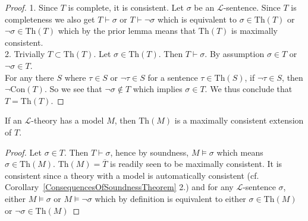 \begin{proof}
    1. Since $T$ is complete, it is consistent. Let $\sigma$ be an $\mathcal{L}$-sentence. Since $T$ is completeness we also get $T\vdash \sigma$ or $T\vdash \neg\sigma$ which is equivalent to $\sigma\in \mathrm{Th}(T)$ or $\neg \sigma\in \mathrm{Th}(T)$ which by the prior lemma means that $\mathrm{Th}(T)$ is maximally consistent.\\
    2. Trivially $T\subset \mathrm{Th}(T)$. Let $\sigma \in \mathrm{Th}(T)$. Then $T\vdash \sigma$. By assumption $\sigma\in T$ or $\neg\sigma\in T$.\\ 
    For any there $S$ where $\tau\in S$ or $\neg\tau\in S$ for a  sentence $\tau\in \mathrm{Th}(S)$, if $\neg\tau\in S$, then $\neg\mathrm{Con}(T)$. So we see that $\neg\sigma\notin T$ which implies $\sigma \in T$. We thus conclude that $T=\mathrm{Th}(T)$. 
\end{proof}
\begin{lemma}
    If an $\mathcal{L}$-theory has a model $M$, then $\mathrm{Th}(M)$ is a maximally consistent extension of $T$. 
\end{lemma}
\begin{proof}
    Let $\sigma\in T$. Then $T\vdash \sigma$, hence by soundness, $M\vDash \sigma$ which means $\sigma\in \mathrm{Th}(M)$. $\mathrm{Th}(M)=\overline{T}$ is readily seen to be maximally consistent. It is consistent since a theory with a model is automatically consistent (cf. Corollary~\ref{ConsequencesOfSoundnessTheorem} 2.) and for any $\mathcal{L}$-sentence $\sigma$, either $M\vDash \sigma$ or $M\vDash \neg\sigma$ which by definition is equivalent to either $\sigma\in \mathrm{Th}(M)$ or $\neg\sigma \in \mathrm{Th}(M)$
\end{proof}

